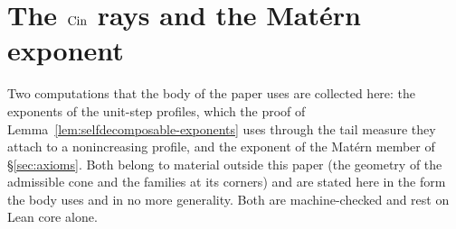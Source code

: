 
\section{The \texorpdfstring{$\operatorname{Cin}$}{Cin} rays and the Mat\'ern exponent}\label{sec:appendix}

Two computations that the body of the paper uses are collected here: the exponents of the
unit-step profiles, which the proof of Lemma~\ref{lem:selfdecomposable-exponents} uses through
the tail measure they attach to a nonincreasing profile, and the exponent of the Mat\'ern
member of \S\ref{sec:axioms}. Both belong to material outside this paper (the geometry of
the admissible cone and the families at its corners) and are stated here in the form the
body uses and in no more generality. Both are machine-checked and rest on Lean core alone.

